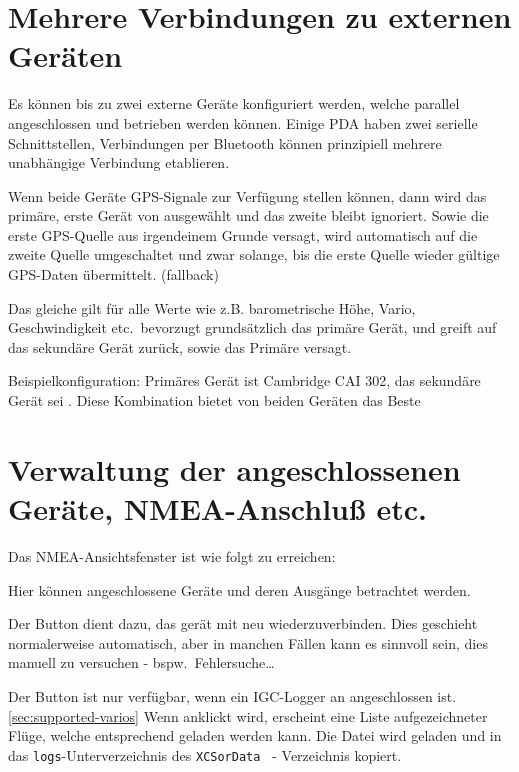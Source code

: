 \section{Mehrere Verbindungen zu externen Geräten}

Es können bis zu zwei externe Geräte konfiguriert werden, welche parallel angeschlossen und betrieben werden können. Einige \textsf{PDA} haben zwei serielle Schnittstellen, Verbindungen per Bluetooth können prinzipiell mehrere unabhängige Verbindung etablieren.

Wenn  beide Geräte GPS-Signale zur Verfügung stellen können, dann wird das primäre, erste Gerät von \xc ausgewählt und das zweite bleibt ignoriert. Sowie die erste GPS-Quelle aus irgendeinem Grunde versagt, wird automatisch auf die zweite Quelle umgeschaltet und zwar solange, bis die erste Quelle wieder gültige GPS-Daten übermittelt. (fallback)

Das gleiche gilt für alle Werte wie z.B. barometrische Höhe, Vario, Geschwindigkeit etc.\
\xc bevorzugt grundsätzlich das primäre Gerät, und greift auf das sekundäre Gerät zurück, sowie das Primäre versagt.

Beispielkonfiguration:
Primäres Gerät ist Cambridge CAI 302, das sekundäre Gerät sei \fl. Diese Kombination bietet von beiden Geräten das Beste
\section{Verwaltung der angeschlossenen Geräte, NMEA-Anschluß etc.\ }

Das NMEA-Ansichtsfenster ist wie folgt zu erreichen:

Hier können angeschlossene Geräte und  deren Ausgänge  betrachtet werden.

Der Button  dient dazu, das gerät mit \xc neu wiederzuverbinden. Dies geschieht normalerweise automatisch, aber in manchen Fällen kann es sinnvoll sein, dies manuell zu versuchen - bspw.\ Fehlersuche\dots

Der Button  ist nur verfügbar, wenn ein IGC-Logger an \xc angeschlossen ist.  \ref{sec:supported-varios}
Wenn anklickt wird, erscheint eine Liste aufgezeichneter Flüge, welche entsprechend geladen werden kann.  Die Datei  wird geladen und in das \texttt{logs}-Unterverzeichnis des  \texttt{XCSorData } - Verzeichnis kopiert.

